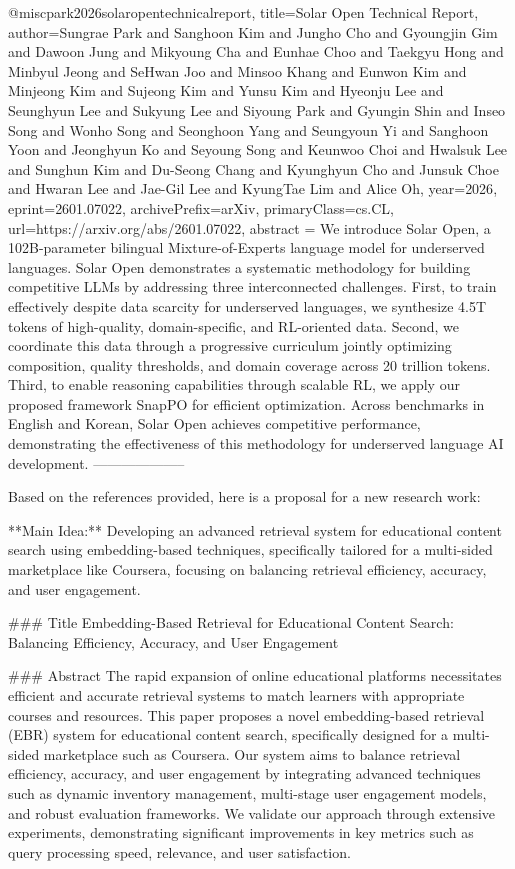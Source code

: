 {}@misc{park2026solaropentechnicalreport,
      title={Solar Open Technical Report}, 
      author={Sungrae Park and Sanghoon Kim and Jungho Cho and Gyoungjin Gim and Dawoon Jung and Mikyoung Cha and Eunhae Choo and Taekgyu Hong and Minbyul Jeong and SeHwan Joo and Minsoo Khang and Eunwon Kim and Minjeong Kim and Sujeong Kim and Yunsu Kim and Hyeonju Lee and Seunghyun Lee and Sukyung Lee and Siyoung Park and Gyungin Shin and Inseo Song and Wonho Song and Seonghoon Yang and Seungyoun Yi and Sanghoon Yoon and Jeonghyun Ko and Seyoung Song and Keunwoo Choi and Hwalsuk Lee and Sunghun Kim and Du-Seong Chang and Kyunghyun Cho and Junsuk Choe and Hwaran Lee and Jae-Gil Lee and KyungTae Lim and Alice Oh},
      year={2026},
      eprint={2601.07022},
      archivePrefix={arXiv},
      primaryClass={cs.CL},
      url={https://arxiv.org/abs/2601.07022},
      abstract = {We introduce Solar Open, a 102B-parameter bilingual Mixture-of-Experts language model for underserved languages. Solar Open demonstrates a systematic methodology for building competitive LLMs by addressing three interconnected challenges. First, to train effectively despite data scarcity for underserved languages, we synthesize 4.5T tokens of high-quality, domain-specific, and RL-oriented data. Second, we coordinate this data through a progressive curriculum jointly optimizing composition, quality thresholds, and domain coverage across 20 trillion tokens. Third, to enable reasoning capabilities through scalable RL, we apply our proposed framework SnapPO for efficient optimization. Across benchmarks in English and Korean, Solar Open achieves competitive performance, demonstrating the effectiveness of this methodology for underserved language AI development.}
}
        --------------------
        


Based on the references provided, here is a proposal for a new research work:

**Main Idea:** Developing an advanced retrieval system for educational content search using embedding-based techniques, specifically tailored for a multi-sided marketplace like Coursera, focusing on balancing retrieval efficiency, accuracy, and user engagement.

### Title
Embedding-Based Retrieval for Educational Content Search: Balancing Efficiency, Accuracy, and User Engagement

### Abstract
The rapid expansion of online educational platforms necessitates efficient and accurate retrieval systems to match learners with appropriate courses and resources. This paper proposes a novel embedding-based retrieval (EBR) system for educational content search, specifically designed for a multi-sided marketplace such as Coursera. Our system aims to balance retrieval efficiency, accuracy, and user engagement by integrating advanced techniques such as dynamic inventory management, multi-stage user engagement models, and robust evaluation frameworks. We validate our approach through extensive experiments, demonstrating significant improvements in key metrics such as query processing speed, relevance, and user satisfaction.

